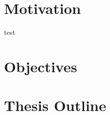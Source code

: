 \section{Motivation}

test\cite{church-1932-spfl}

\section{Objectives}



\section{Thesis Outline}



\cleardoublepage